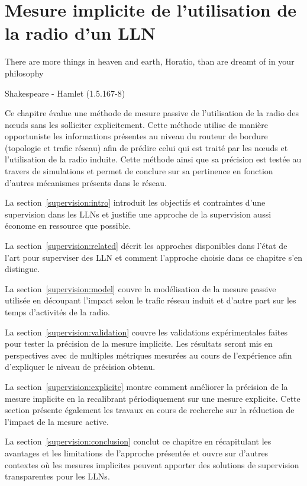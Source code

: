 
\chapter{Mesure implicite de l'utilisation de la radio d'un \ac{LLN}} %
\label{supervision}

\epigraph{There are more things in heaven and earth, Horatio, than are  dreamt of in your philosophy}{Shakespeare - Hamlet (1.5.167-8)}

\minitoc

Ce chapitre évalue une méthode de mesure passive de l'utilisation de la radio des nœuds sans les solliciter explicitement.
Cette méthode utilise de manière opportuniste les informations présentes au niveau du routeur de bordure (topologie et trafic réseau) afin de prédire celui qui est traité par les nœuds et l'utilisation de la radio induite.
Cette méthode ainsi que sa précision est testée au travers de simulations et permet de conclure sur sa pertinence en fonction d'autres mécanismes présents dans le réseau.

La section~\ref{supervision:intro} introduit les objectifs et contraintes d'une supervision dans les \ac{LLN}s et justifie une approche de la supervision aussi économe en ressource que possible.

La section~\ref{supervision:related} décrit les approches disponibles dans l'état de l'art pour superviser des \ac{LLN} et comment l'approche choisie dans ce chapitre s'en distingue.

La section~\ref{supervision:model} couvre la modélisation de la mesure passive utilisée en découpant l'impact selon le trafic réseau induit et d'autre part sur les temps d'activités de la radio.

La section~\ref{supervision:validation} couvre les validations expérimentales faites pour tester la précision de la mesure implicite.
Les résultats seront mis en perspectives avec de multiples métriques mesurées au cours de l'expérience afin d'expliquer le niveau de précision obtenu.

La section~\ref{supervision:explicite} montre comment améliorer la précision de la mesure implicite en la recalibrant périodiquement sur une mesure explicite.
Cette section présente également les travaux en cours de recherche sur la réduction de l'impact de la mesure active.

La section~\ref{supervision:conclusion} conclut ce chapitre en récapitulant les avantages et les limitations de l'approche présentée et ouvre sur d'autres contextes où les mesures implicites peuvent apporter des solutions de supervision transparentes pour les \ac{LLN}s.


